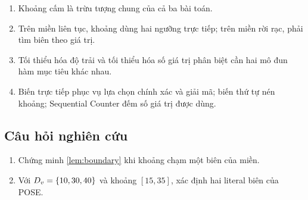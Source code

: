 \begin{summarybox}
\begin{enumerate}
  \item Khoảng cấm là trừu tượng chung của cả ba bài toán.
  \item Trên miền liên tục, khoảng dùng hai ngưỡng trực tiếp; trên miền
        rời rạc, phải tìm biên theo giá trị.
  \item Tối thiểu hóa độ trải và tối thiểu hóa số giá trị phân biệt cần hai mô
        đun hàm mục tiêu khác nhau.
  \item Biến trực tiếp phục vụ lựa chọn chính xác và giải mã; biến thứ tự nén
        khoảng; Sequential Counter đếm số giá trị được dùng.
\end{enumerate}
\end{summarybox}

\subsection*{Câu hỏi nghiên cứu}
\begin{enumerate}
  \item Chứng minh \cref{lem:boundary} khi khoảng chạm một biên của miền.
  \item Với \(D_v=\left\{10,30,40\right\}\) và khoảng \([15,35]\), xác định hai
        literal biên của POSE.
\end{enumerate}
